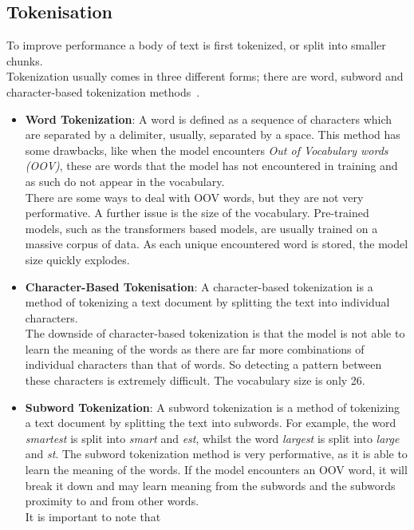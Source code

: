 \subsection{Tokenisation}
\label{sec:tokenisation}
To improve performance a body of text is first tokenized, or split into smaller chunks.\\
Tokenization usually comes in three different forms; there are word, subword and character-based tokenization methods~\autocite{WhatTokenizationTokenization2020}.
\begin{itemize}
	\item \textbf{Word Tokenization}: A word is defined as a sequence of characters which are separated by a delimiter, usually, separated by a space.
	      This method has some drawbacks, like when the model encounters \emph{Out of Vocabulary words (OOV)}, these are words that the model has not encountered
	      in training and as such do not appear in the vocabulary.\\ There are some ways to deal with OOV words, but they are not very performative.
	      \bigbreak
	      A further issue is the size of the vocabulary. Pre-trained models, such as the transformers based models, are usually trained on a massive corpus of
	      data. As each unique encountered word is stored, the model size quickly explodes.
	\item \textbf{Character-Based Tokenisation}: A character-based tokenization is a method of tokenizing a text document by splitting the text into
	      individual characters. \\
	      The downside of character-based tokenization is that the model is not able to learn the meaning of the words as there are far more combinations of
	      individual characters than that of words. So detecting a pattern between these characters is extremely difficult. The vocabulary size is only
	      26.
	\item \textbf{Subword Tokenization}: A subword tokenization is a method of tokenizing a text document by splitting the text into subwords.
	      For example, the word \emph{smartest} is split into \emph{smart} and \emph{est}, whilst the word \emph{largest} is split into \emph{large} and \emph{st}.
	      The subword tokenization method is very performative, as it is able to learn the meaning of the words. If the model encounters an OOV word, it
	      will break it down and may learn meaning from the subwords and the subwords proximity to and from other words. \\
	      It is important to note that

\end{itemize}
